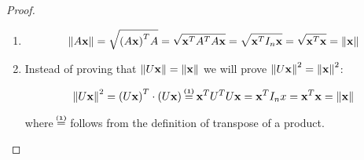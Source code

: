 \documentclass[computationalMathematics.tex]{subfiles}
\begin{document}
\begin{proof}
	\begin{enumerate}
		\item 
		\[
			\left\lVert A{\bf x }\right\rVert = \sqrt{{(A{\bf x })}^{T} A{\bf  }} = \sqrt{{{\bf x }}^{T}{A}^{T} A {\bf x }} = \sqrt{{{\bf x }}^{T} I_n {\bf x }} = \sqrt{{{\bf x }}^{T} {\bf x }} = \left\lVert{\bf x }\right\rVert
		\]
		\item  Instead of proving that $\left\lVert U{\bf x }\right\rVert = \left\lVert{\bf x }\right\rVert$ we will prove ${\left\lVert U{\bf x }\right\rVert}^2 = {\left\lVert{\bf x }\right\rVert}^2$:
		
		\[
		\sqrnorm{U\vect{x}} = \tr{(U\vect{x})} \cdot (U\vect{x}) \numeq{(1)} \tr{\vect{x}} \tr{U} U \vect{x} = \tr{\vect{x}} I_n x = \tr{\vect{x}} \vect{x} = \norm{\vect{x}}
		\]
		
		where $\numeq{(1)}$ follows from the definition of transpose of a product.
	\end{enumerate}
  
\end{proof}
\end{document}
